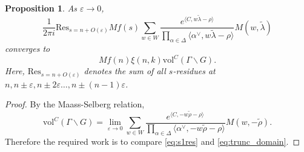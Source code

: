 \documentclass[11pt]{amsart}
\newtheorem{proposition}[theorem]{Proposition}
\numberwithin{theorem}{section}
\numberwithin{equation}{section}
\theoremstyle{remark}
\theoremstyle{definition}
\newcommand{\vol}{\mathrm{vol}}
\begin{document}
\begin{proposition} \label{prop:chicken}
As $\varepsilon \rightarrow 0$,
\begin{equation} \label{eq:s1res}
\frac{1}{2\pi i}\mathrm{Res}_{s=n+O(\varepsilon)} Mf(s)\sum_{w \in W} \frac{e^{\langle C, w\tilde\lambda-\rho\rangle}}{\prod_{\alpha \in \Delta} \langle \alpha^\vee, w\tilde\lambda-\rho \rangle}M(w,\tilde\lambda)
\end{equation}
converges to 
\begin{equation*}
Mf(n)\xi(n,k) \vol^C(\Gamma\backslash G).
\end{equation*}
Here, $\mathrm{Res}_{s=n+O(\varepsilon)}$ denotes the sum of all $s$-residues at $n,n\pm\varepsilon,n\pm2\varepsilon\ldots,n\pm(n-1)\varepsilon$.
\end{proposition}
\begin{proof}
By the Maass-Selberg relation,
\begin{equation} \label{eq:trunc_domain}
\vol^C(\Gamma\backslash G)=\lim_{\varepsilon \rightarrow 0}\sum_{w \in W} \frac{e^{\langle C, -w\tilde\rho-\rho\rangle}}{\prod_{\alpha \in \Delta} \langle \alpha^\vee, -w\tilde\rho-\rho \rangle}M(w,-\tilde\rho).
\end{equation}
Therefore the required work is to compare \eqref{eq:s1res} and \eqref{eq:trunc_domain}.


\end{proof}
\end{document}
